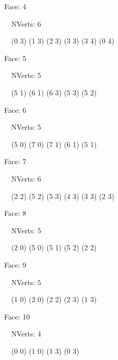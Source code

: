 \documentclass{article}
\begin{document}
    {\footnotesize

    Face: 4

    \   \    NVerts: 6

     \   \   (0 3) (1 3) (2 3) (3 3) (3 4) (0 4)}

    {\footnotesize

    Face: 5

    \   \    NVerts: 5

     \   \   (5 1) (6 1) (6 3) (5 3) (5 2)}

    {\footnotesize

    Face: 6

    \   \    NVerts: 5

     \   \   (5 0) (7 0) (7 1) (6 1) (5 1)}

    {\footnotesize

    Face: 7

    \   \    NVerts: 6

     \   \   (2 2) (5 2) (5 3) (4 3) (3 3) (2 3)}

    {\footnotesize

    Face: 8

    \   \    NVerts: 5

     \   \   (2 0) (5 0) (5 1) (5 2) (2 2)}

    {\footnotesize

    Face: 9

    \   \    NVerts: 5

     \   \   (1 0) (2 0) (2 2) (2 3) (1 3)}

    {\footnotesize

    Face: 10

    \   \    NVerts: 4

     \   \   (0 0) (1 0) (1 3) (0 3)}


     \newpage
\end{document}
